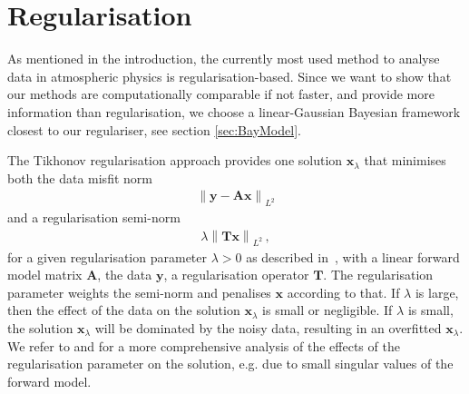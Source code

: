 \section{Regularisation}
\label{sec:regularise}
As mentioned in the introduction, the currently most used method to analyse data in atmospheric physics is regularisation-based.
Since we want to show that our methods are computationally comparable if not faster, and provide more information than regularisation, we choose a linear-Gaussian Bayesian framework closest to our regulariser, see section \ref{sec:BayModel}.

The Tikhonov regularisation approach provides one solution $\bm{x}_{\lambda}$ that minimises both the data misfit norm
\begin{align}
	\left\lVert \bm{y} - \bm{A} \bm{x} \right\rVert_{L^2}
\end{align} and a regularisation semi-norm
\begin{align}
	\lambda \left\lVert \bm{T} \bm{x} \right\rVert_{L^2} \, , \label{semiNorm}
\end{align}
for a given regularisation parameter $\lambda > 0 $ as described in~\cite{fox2016fast}, with a linear forward model matrix $\bm{A}$, the data $\bm{y}$, a regularisation operator $\bm{T}$.
The regularisation parameter weights the semi-norm and penalises $\bm{x}$ according to that.
If $\lambda$ is large, then the effect of the data on the solution $\bm{x}_{\lambda}$ is small or negligible.
If $\lambda$ is small, the solution $\bm{x}_{\lambda}$ will be dominated by the noisy data, resulting in an overfitted $\bm{x}_{\lambda}$.
We refer to  \cite{hansen1989GSVD} and \cite{tan2016LecNot} for a more comprehensive analysis of the effects of the regularisation parameter on the solution, e.g. due to small singular values of the forward model.

